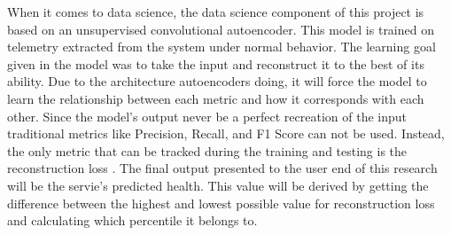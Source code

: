 When it comes to data science, the data science component of this project is based on an unsupervised convolutional autoencoder. This model is trained on telemetry extracted from the system under normal behavior. The learning goal given in the model was to take the input and reconstruct it to the best of its ability. Due to the architecture autoencoders doing, it will force the model to learn the relationship between each metric and how it corresponds with each other. Since the model's output never be a perfect recreation of the input traditional metrics like Precision, Recall, and F1 Score can not be used. Instead, the only metric that can be tracked during the training and testing is the reconstruction loss \citep{ghasedi2017deep}. The final output presented to the user end of this research will be the servie's predicted health. This value will be derived by getting the difference between the highest and lowest possible value for reconstruction loss and calculating which percentile it belongs to.